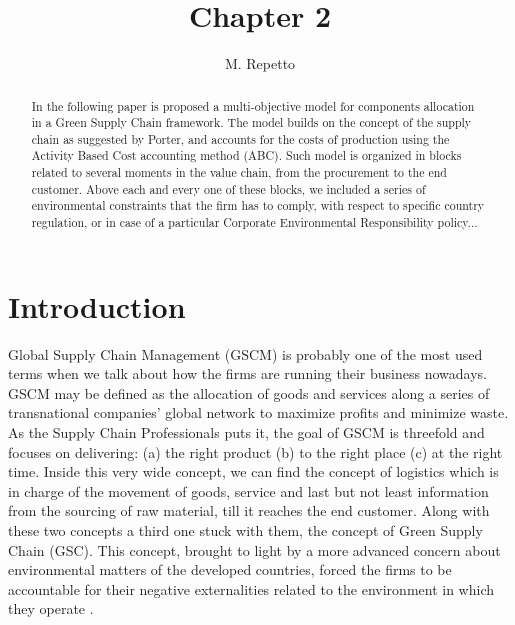 \documentclass{article}
\begin{document}
  \title{Chapter 2}

  \author{M. Repetto}

  \date{}

\maketitle

\begin{abstract}
  In the following paper is proposed a multi-objective model for components allocation in a Green Supply Chain framework. The model builds on the concept of the supply chain as suggested by Porter, and accounts for the costs of production using the Activity Based Cost accounting method (ABC). Such model is organized in blocks related to several moments in the value chain, from the procurement to the end customer. Above each and every one of these blocks, we included a series of environmental constraints that the firm has to comply, with respect to specific country regulation, or in case of a particular Corporate Environmental Responsibility policy...
\end{abstract}

\section{Introduction}
  Global Supply Chain Management (GSCM) is probably one of the most used terms when we talk about how the firms are running their business nowadays. GSCM may be defined as the allocation of goods and services along a series of transnational companies' global network to maximize profits and minimize waste. As the Supply Chain Professionals puts it, the goal of GSCM is threefold and focuses on delivering: (a) the right product (b) to the right place (c) at the right time.
  Inside this very wide concept, we can find the concept of logistics which is in charge of the movement of goods, service and last but not least information from the sourcing of raw material, till it reaches the end customer.
  Along with these two concepts a third one stuck with them, the concept of Green Supply Chain (GSC). This concept, brought to light by a more advanced concern about environmental matters of the developed countries, forced the firms to be accountable for their negative externalities related to the environment in which they operate \cite{srivastava_green_2007}.
\end{document}

